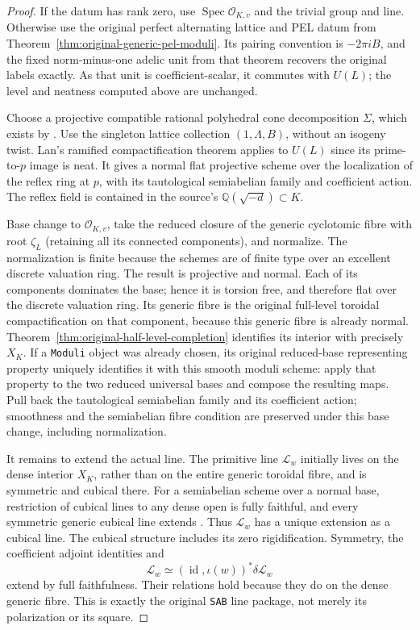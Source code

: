 \begin{proof}
If the datum has rank zero, use $\operatorname{Spec}\mathcal O_{K,v}$
and the trivial group and line.  Otherwise use the original perfect
alternating lattice and PEL datum from
Theorem~\ref{thm:original-generic-pel-moduli}.  Its pairing convention
is $-2\pi iB$, and the fixed norm-minus-one adelic unit from that
theorem recovers the original labels exactly.  As that unit is
coefficient-scalar, it commutes with $U(L)$; the level and neatness
computed above are unchanged.

Choose a projective compatible rational polyhedral cone decomposition
$\Sigma$, which exists by
\cite[Proposition 2.8]{integral-pel-projective}.  Use the singleton
lattice collection $(1,\Lambda,B)$, without an isogeny twist.
Lan's ramified compactification theorem
\cite[Theorem 6.1]{integral-pel-projective} applies to $U(L)$ since
its prime-to-$p$ image is neat.  It gives a normal flat projective
scheme over the localization of the reflex ring at $p$, with its
tautological semiabelian family and coefficient action.  The reflex
field is contained in the source's $\mathbb Q(\sqrt{-d})\subset K$.

Base change to $\mathcal O_{K,v}$, take the reduced closure of the
generic cyclotomic fibre with root $\zeta_L$ (retaining all its
connected components), and normalize.
The normalization is finite because the schemes are of finite type
over an excellent discrete valuation ring.  The result is projective
and normal.  Each of its components dominates the base; hence it is
torsion free, and therefore flat over the discrete valuation ring.
Its generic fibre is the original full-level toroidal compactification
on that component, because this generic fibre is already normal.
Theorem~\ref{thm:original-half-level-completion} identifies its interior
with precisely $X_K$.  If a \texttt{Moduli} object was already chosen,
its original reduced-base representing property uniquely identifies
it with this smooth moduli scheme: apply that property to the two
reduced universal bases and compose the resulting maps.
Pull back the tautological semiabelian family and its coefficient
action; smoothness and the semiabelian fibre condition are preserved
under this base change, including normalization.

It remains to extend the actual line.  The primitive line
$\mathcal L_w$ initially lives on the dense interior $X_K$, rather
than on the entire generic toroidal fibre, and is symmetric and
cubical there.  For a semiabelian scheme
over a normal base, restriction of cubical lines to any dense open is
fully faithful, and every symmetric generic cubical line extends
\cite[Proposition 3.3.2.2 and Theorem 3.3.2.3(2)]{integral-pel-lan}.
Thus $\mathcal L_w$ has a unique extension as a cubical line.
The cubical structure includes its zero rigidification.  Symmetry,
the coefficient adjoint identities and
\[
 \mathcal L_w\simeq
 (\operatorname{id},\iota(w))^*\delta\mathcal L_w
\]
extend by full faithfulness.  Their relations hold because they do
on the dense generic fibre.  This is exactly the original
\texttt{SAB} line package, not merely its polarization or its square.


\end{proof}
